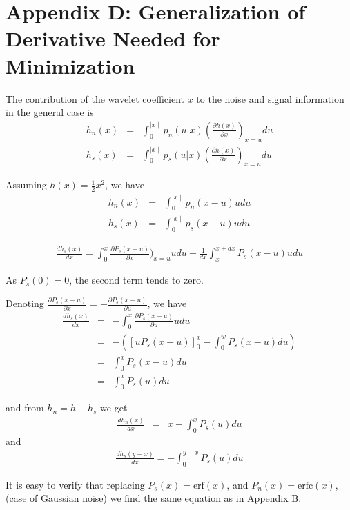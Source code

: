 \chapter*{Appendix D: Generalization of Derivative Needed for Minimization}
\label{annexC}

The contribution of the wavelet coefficient $x$ to the noise and signal
information in the general case is
\begin{eqnarray}
h_n(x) & = & \int_{0}^{\mid x \mid } p_n(u|x) (\frac{\partial h(x)}{\partial 
x})_{x=u} du \\ \nonumber 
h_s(x) & = & \int_{0}^{\mid x \mid } p_s(u|x) (\frac{\partial h(x)}{\partial 
x})_{x=u} du
\end{eqnarray}

Assuming $h(x) = \frac{1}{2}x^2$, we have
\begin{eqnarray}
h_n(x) & = & \int_{0}^{\mid x \mid } p_n(x-u) u du \\ \nonumber 
h_s(x) & = & \int_{0}^{\mid x \mid } p_s(x-u) u du
\end{eqnarray}


\begin{eqnarray}
\frac{ d h_{s}(x)}{dx} = \int_0^x  \frac{\partial P_s(x-u)}{\partial x})_{x=u} u du +
         \frac{1}{dx}  \int_x^{x+dx} P_s(x-u) u  du
\end{eqnarray}

As $P_s(0) = 0$, the second term tends to zero.

Denoting  $\frac{\partial P_s(x-u)}{\partial x} = - \frac{\partial P_s(x-u)}{\partial u}$, we have  
\begin{eqnarray}
\frac{ d h_{s}(x)}{dx} & = & - \int_0^x \frac{\partial P_s(x-u)}{\partial u} u du \\
& = &  - ( [u P_s(x-u) ]_0^x - \int_0^w P_s(x-u) du) \\
& = & \int_0^x P_s(x-u) du \\
& = & \int_0^x P_s(u) du
\end{eqnarray}

and from $h_n = h - h_s$ we get
\begin{eqnarray}
\frac{ d h_{n}(x)}{dx} & = &  x -  \int_0^x P_s(u) du
\end{eqnarray}
and 
\begin{eqnarray}
\frac{ d h_{s}(y-x)}{dx} = - \int_0^{y-x} P_s(u) du
\end{eqnarray}

It is easy to verify that replacing $P_s(x) = \mbox{erf}(x)$, 
and $P_n(x) = \mbox{erfc}(x)$,
(case of Gaussian noise) we find the same equation as in Appendix B.

